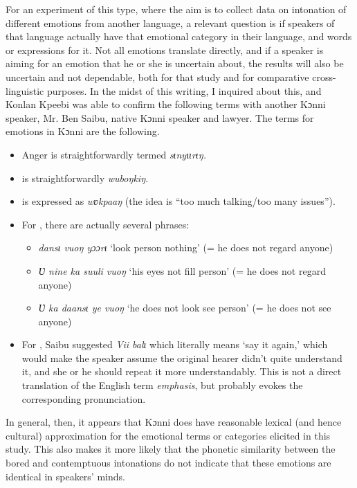 \documentclass[output=paper]{langsci/langscibook}
\begin{document}
For an experiment of this type, where the aim is to collect data on intonation of different emotions from another language, a relevant question is if speakers of that language actually have that emotional category in their language, and words or expressions for it. Not all emotions translate directly, and if a speaker is aiming for an emotion that he or she is uncertain about, the results will also be uncertain and not dependable, both for that study and for comparative cross-linguistic purposes. In the midst of this writing, I inquired about this, and Konlan Kpeebi was able to confirm the following terms with another Kɔnni speaker, Mr. Ben Saibu, native Kɔnni speaker and lawyer. The\textit{ }terms for emotions in Kɔnni are the following.

\begin{itemize}
\item Anger is straightforwardly termed \emph{sɩnyɩɩrɩŋ}\emph{\textup{.}}
\item {} is straightforwardly \emph{wuboŋkiŋ}. 
\item {} is expressed as \emph{wʋkpaaŋ} (the idea is “too much talking/too many issues”).
\item For , there are actually several phrases: 

\begin{itemize}
\item \emph{dansɩ vuoŋ yɔɔrɩ} ‘look person nothing’ (= he does not regard anyone) 
\item \emph{Ʋ nine ka suuli vuoŋ} ‘his eyes not fill person’ (= he does not regard anyone) 
\item \emph{Ʋ ka daansɩ ye vuoŋ }‘he does not look see person’ (= he does not see anyone)
\end{itemize}
\item For , Saibu suggested \textit{Vii balɩ} which literally means ‘say it again,’ which would make the speaker assume the original hearer didn’t quite understand it, and she or he should repeat it more understandably. This is not a direct translation of the English term \emph{emphasis}, but probably evokes the corresponding pronunciation.
\end{itemize}

In general, then, it appears that Kɔnni does have reasonable lexical (and hence cultural) approximation for the emotional terms or categories elicited in this study. This also makes it more likely that the phonetic similarity between the bored and contemptuous intonations do not indicate that these emotions are identical in speakers’ minds. 
\end{document}
